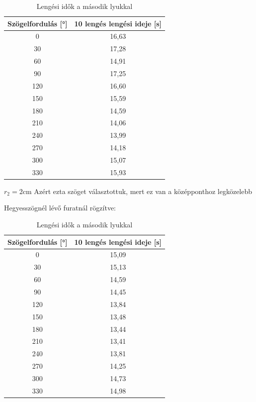 \documentclass{article}
\begin{document}
\begin{table}[H]
    \centering
    \begin{tabular}{|c|c|}
        \hline
        Szögelfordulás [°] & 10 lengés lengési ideje [s] \\ \hline
         0 & 16,63 \\ \hline 
         30 & 17,28 \\ \hline
         60 & 14,91\\ \hline 
         90 & 17,25 \\ \hline
         120 & 16,60 \\ \hline 
         150 & 15,59 \\ \hline
         180 & 14,59 \\ \hline
         210 & 14,06 \\ \hline
         240 & 13,99 \\ \hline
         270 & 14,18 \\ \hline
         300 & 15,07 \\ \hline
         330 & 15,93 \\ \hline
        
    \end{tabular}
    \caption{Lengési idők a második lyukkal}
    \label{tab:lengesiido_1.2}
\end{table}

$r_{2}= 2 \text{cm}$
Azért ezta szöget választottuk, mert ez van a középponthoz legközelebb

Hegyesszögnél lévő furatnál rögzítve:

\begin{table}[H]
    \centering
    \begin{tabular}{|c|c|}
        \hline
        Szögelfordulás [°] & 10 lengés lengési ideje [s] \\ \hline
         0 & 15,09 \\ \hline 
         30 & 15,13 \\ \hline
         60 & 14,59\\ \hline 
         90 & 14,45\\ \hline
         120 & 13,84 \\ \hline 
         150 & 13,48 \\ \hline
         180 & 13,44 \\ \hline
         210 & 13,41 \\ \hline
         240 & 13,81 \\ \hline
         270 & 14,25 \\ \hline
         300 & 14,73 \\ \hline
         330 & 14,98 \\ \hline
        
    \end{tabular}
    \caption{Lengési idők a második lyukkal}
    \label{tab:lengesiido_2.1}
\end{table}
\end{document}
